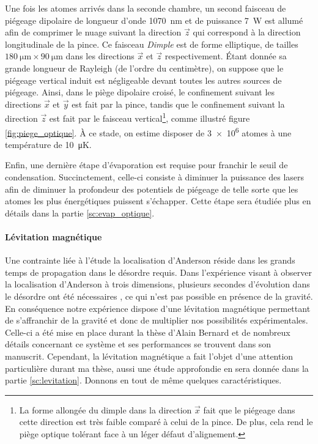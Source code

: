 Une fois les atomes arrivés dans la seconde chambre, un second faisceau de piégeage dipolaire de longueur d'onde \SI{1070}{\nano\metre} et de puissance \SI{7}{\watt} est allumé afin de comprimer le nuage suivant la direction $\vec{z}$ qui correspond à la direction longitudinale de la pince. Ce faisceau \emph{Dimple} est de forme elliptique, de tailles $\SI{180}{\micro\metre} \times \SI{90}{\micro\metre}$ dans les directions $\vec{x}$ et $\vec{z}$ respectivement. Étant donnée sa grande longueur de Rayleigh (de l'ordre du centimètre), on suppose que le piégeage vertical induit est négligeable devant toutes les autres sources de piégeage. Ainsi, dans le piège dipolaire croisé, le confinement suivant les directions $\vec{x}$ et $\vec{y}$ est fait par la pince, tandis que le confinement suivant la direction $\vec{z}$ est fait par le faisceau vertical\footnote{La forme allongée du dimple dans la direction $\vec{x}$ fait que le piégeage dans cette direction est très faible comparé à celui de la pince. De plus, cela rend le piège optique tolérant face à un léger défaut d'alignement.}, comme illustré figure \ref{fig:piege_optique}. À ce stade, on estime disposer de \num{3e6} atomes à une température de \SI{10}{\micro\kelvin}.

Enfin, une dernière étape d'évaporation est requise pour franchir le seuil de condensation. Succinctement, celle-ci consiste à diminuer la puissance des lasers afin de diminuer la profondeur des potentiels de piégeage de telle sorte que les atomes les plus énergétiques puissent s'échapper. Cette étape sera étudiée plus en détails dans la partie \ref{sc:evap_optique}.



\paragraph*{Lévitation magnétique}
Une contrainte liée à l'étude la localisation d'Anderson réside dans les grands temps de propagation dans le désordre requis. Dans l'expérience visant à observer la localisation d'Anderson à trois dimensions, plusieurs secondes d'évolution dans le désordre ont été nécessaires \citep{jendrzejewski2012three}, ce qui n'est pas possible en présence de la gravité. En conséquence notre expérience dispose d'une lévitation magnétique permettant de s'affranchir de la gravité et donc de multiplier nos possibilités expérimentales. Celle-ci a été mise en place durant la thèse d'Alain Bernard et de nombreux détails concernant ce système et ses performances se trouvent dans son manuscrit. Cependant, la lévitation magnétique a fait l'objet d'une attention particulière durant ma thèse, aussi une étude approfondie en sera donnée dans la partie \ref{sc:levitation}. Donnons en tout de même quelques caractéristiques.

